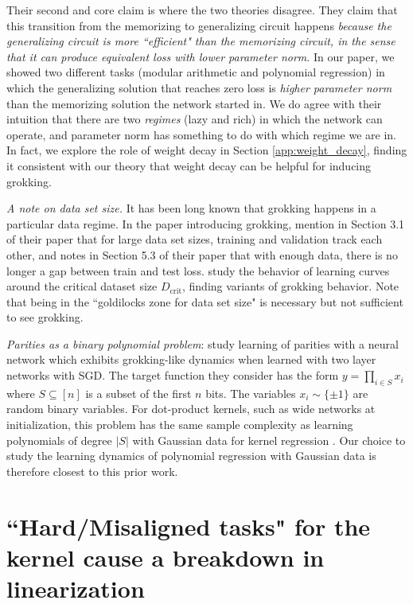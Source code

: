 \documentclass{article} %
\begin{document}
Their second and core claim is where the two theories disagree. They claim that this transition from the memorizing to generalizing circuit happens \textit{because the generalizing circuit is more ``efficient" than the memorizing circuit, in the sense that it can produce equivalent loss with lower parameter norm}. In our paper, we showed two different tasks (modular arithmetic and polynomial regression) in which the generalizing solution that reaches zero loss is \textit{higher parameter norm} than the memorizing solution the network started in. We do agree with their intuition that there are two \textit{regimes} (lazy and rich) in which the network can operate, and parameter norm has something to do with which regime we are in. In fact, we explore the role of weight decay in Section \ref{app:weight_decay}, finding it consistent with our theory that weight decay can be helpful for inducing grokking. 

\textit{A note on data set size.} It has been long known that grokking happens in a particular data regime. In the paper introducing grokking, \cite{power2022grokking} mention in Section 3.1 of their paper that for large data set sizes, training and validation track each other, and \cite{nanda2023progress} notes in Section 5.3 of their paper that with enough data, there is no longer a gap between train and test loss. \cite{varma2023explaining} study the behavior of learning curves around the critical dataset size $D_{\text{crit}}$, finding variants of grokking behavior. Note that being in the ``goldilocks zone for data set size" is necessary but not sufficient to see grokking. 

\textit{Parities as a binary polynomial problem}: \cite{barak2022hidden} study learning of parities with a neural network which exhibits grokking-like dynamics when learned with two layer networks with SGD. The target function they consider has the form $y = \prod_{i \in S} x_i$ where $S \subseteq [n]$ is a subset of the first $n$ bits. The variables $x_i \sim \{ \pm 1 \}$ are random binary variables. For dot-product kernels, such as wide networks at initialization, this problem has the same sample complexity as learning polynomials of degree $|S|$ with Gaussian data for kernel regression \citep{misiakiewicz2022spectrum}. Our choice to study the learning dynamics of polynomial regression with Gaussian data is therefore closest to this prior work.


\section{``Hard/Misaligned tasks" for the kernel cause a breakdown in linearization}\label{app:hard_tasks_more_features}
\end{document}
